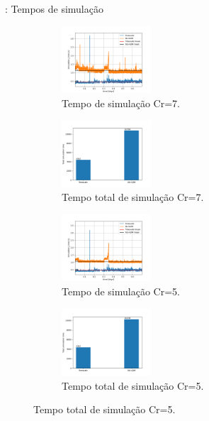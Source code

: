 \documentclass[professionalfont]{beamer}
\begin{document}
\begin{frame}{\FrameProblemName: {\small Tempos de simulação}}
    \begin{figure}[!htbp]
        \centering
        \begin{subfigure}{.48\textwidth}
            \centering
            \includegraphics[height=2.5cm]{./imgs/pr4/tempo_sim_cr7.png}
            \caption{Tempo de simulação Cr=7.}
        \end{subfigure}
        \hfill
        \begin{subfigure}{.48\textwidth}
            \centering
            \includegraphics[height=2.5cm]{./imgs/pr4/total_time_cr7.png}
            \caption{Tempo total de simulação Cr=7.}
        \end{subfigure}
        \bigskip
        \begin{subfigure}{.48\textwidth}
            \centering
            \includegraphics[height=2.5cm]{./imgs/pr4/tempo_sim_cr5.png}
            \caption{Tempo de simulação Cr=5.}
        \end{subfigure}
        \hfill
        \begin{subfigure}{.48\textwidth}
            \centering
            \includegraphics[height=2.5cm]{./imgs/pr4/total_time_cr5.png}
            \caption{Tempo total de simulação Cr=5.}
        \end{subfigure}
        \label{fig:fig4_pr4}
    \end{figure}
\end{frame}
\end{document}
